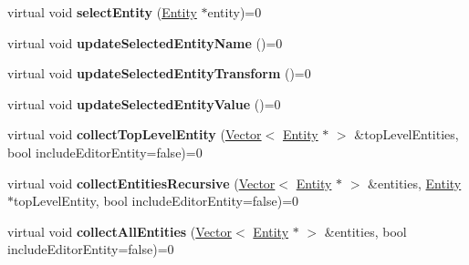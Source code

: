 \begin{DoxyCompactItemize}
\item 
virtual void {\bfseries select\+Entity} (\hyperlink{class_magnum_1_1_entity}{Entity} $\ast$entity)=0\hypertarget{class_magnum_1_1_project_model_base_a98b0b3ff07fdda04ef4f5ee46e99e311}{}\label{class_magnum_1_1_project_model_base_a98b0b3ff07fdda04ef4f5ee46e99e311}

\item 
virtual void {\bfseries update\+Selected\+Entity\+Name} ()=0\hypertarget{class_magnum_1_1_project_model_base_a10763b51ecb9df3131a1bb7e90a0a735}{}\label{class_magnum_1_1_project_model_base_a10763b51ecb9df3131a1bb7e90a0a735}

\item 
virtual void {\bfseries update\+Selected\+Entity\+Transform} ()=0\hypertarget{class_magnum_1_1_project_model_base_aff5628dd4c644535a034b070959a67d9}{}\label{class_magnum_1_1_project_model_base_aff5628dd4c644535a034b070959a67d9}

\item 
virtual void {\bfseries update\+Selected\+Entity\+Value} ()=0\hypertarget{class_magnum_1_1_project_model_base_ad935878f5564a4e6747007c596e8db02}{}\label{class_magnum_1_1_project_model_base_ad935878f5564a4e6747007c596e8db02}

\item 
virtual void {\bfseries collect\+Top\+Level\+Entity} (\hyperlink{class_magnum_1_1_vector}{Vector}$<$ \hyperlink{class_magnum_1_1_entity}{Entity} $\ast$ $>$ \&top\+Level\+Entities, bool include\+Editor\+Entity=false)=0\hypertarget{class_magnum_1_1_project_model_base_a5043ded189109785511924837d4ba400}{}\label{class_magnum_1_1_project_model_base_a5043ded189109785511924837d4ba400}

\item 
virtual void {\bfseries collect\+Entities\+Recursive} (\hyperlink{class_magnum_1_1_vector}{Vector}$<$ \hyperlink{class_magnum_1_1_entity}{Entity} $\ast$ $>$ \&entities, \hyperlink{class_magnum_1_1_entity}{Entity} $\ast$top\+Level\+Entity, bool include\+Editor\+Entity=false)=0\hypertarget{class_magnum_1_1_project_model_base_ad9d1c5cf5dba4f073b55ae2a917ae3cc}{}\label{class_magnum_1_1_project_model_base_ad9d1c5cf5dba4f073b55ae2a917ae3cc}

\item 
virtual void {\bfseries collect\+All\+Entities} (\hyperlink{class_magnum_1_1_vector}{Vector}$<$ \hyperlink{class_magnum_1_1_entity}{Entity} $\ast$ $>$ \&entities, bool include\+Editor\+Entity=false)=0\hypertarget{class_magnum_1_1_project_model_base_aa7eb0d4a724603bd0786cc51a2d7b7ac}{}\label{class_magnum_1_1_project_model_base_aa7eb0d4a724603bd0786cc51a2d7b7ac}


\end{DoxyCompactItemize}
